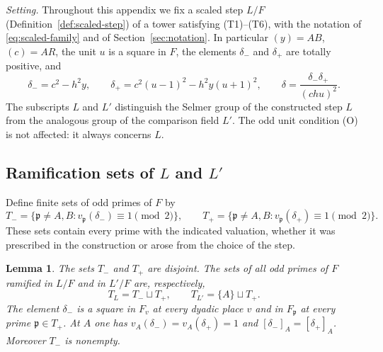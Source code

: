 \documentclass[11pt]{article}
\theoremstyle{plain}
\newtheorem{lemma}[theorem]{Lemma}
\theoremstyle{definition}
\theoremstyle{remark}
\begin{document}
\emph{Setting.}  Throughout this appendix we fix a scaled step $L/F$
(Definition~\ref{def:scaled-step}) of a tower satisfying
\textup{(T1)--(T6)}, with the notation of \eqref{eq:scaled-family} and of
Section~\ref{sec:notation}.  In particular $(y)=AB$, $(c)=AR$, the unit $u$
is a square in $F$, the elements $\delta_-$ and $\delta_+$ are totally
positive, and
\[
 \delta_-=c^2-h^2y,\qquad \delta_+=c^2(u-1)^2-h^2y(u+1)^2,
 \qquad \delta=\frac{\delta_-\delta_+}{(chu)^2}.
\]
The subscripts $L$ and $L'$ distinguish the Selmer group of the
constructed step $L$ from the analogous group of the comparison field
$L'$.  The odd unit condition (O) is not affected: it always concerns $L$.

\subsection{Ramification sets of \texorpdfstring{$L$ and $L'$}{L and L'}}\label{sec:comparison-ramification}

Define finite sets of odd primes of $F$ by
\[
 T_- =\{\mathfrak p\ne A,B:v_{\mathfrak p}(\delta_-)\equiv1\pmod2\},\qquad
 T_+ =\{\mathfrak p\ne A,B:v_{\mathfrak p}(\delta_+)\equiv1\pmod2\}.
\]
These sets contain every prime with the indicated valuation, whether it
was prescribed in the construction or arose from the choice of the step.

\begin{lemma}\label{lem:comparison-supports}
The sets $T_-$ and $T_+$ are disjoint.  The sets of all odd primes of $F$
ramified in $L/F$ and in $L'/F$ are, respectively,
\[
 T_L=T_-\sqcup T_+,\qquad T_{L'}=\{A\}\sqcup T_+.
\]
The element $\delta_-$ is a square in $F_v$ at every dyadic place $v$ and
in $F_{\mathfrak p}$ at every prime $\mathfrak p\in T_+$.  At $A$ one has
$v_A(\delta_-)=v_A(\delta_+)=1$ and $[\delta_-]_A=[\delta_+]_A$.  Moreover
$T_-$ is nonempty.
\end{lemma}
\end{document}
